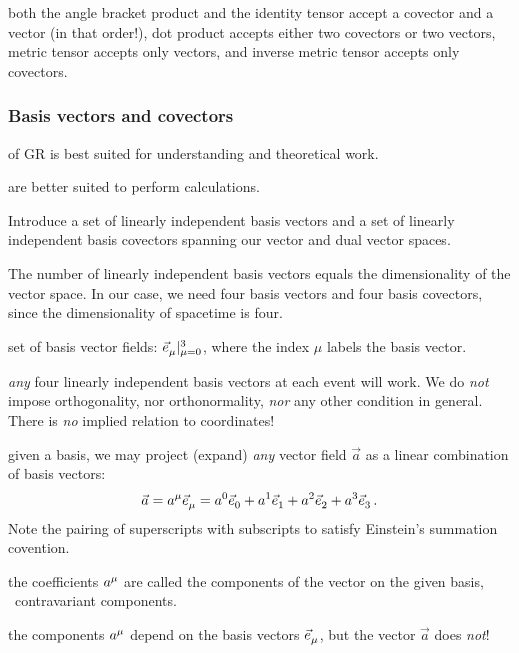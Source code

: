  both the angle bracket product and the identity tensor accept a covector and a vector (in that order!), dot product accepts either two covectors or two vectors, metric tensor accepts only vectors, and inverse metric tensor accepts only covectors.


\subsubsection{Basis vectors and covectors}
%
 of GR is best suited for understanding and theoretical work.

 are better suited to perform calculations.

 Introduce a set of linearly independent basis vectors and a set of linearly independent basis covectors spanning our vector and dual vector spaces.

 The number of linearly independent basis vectors equals the dimensionality of the vector space. In our case, we need four basis vectors and four basis covectors, since the dimensionality of spacetime is four.

 set of basis vector fields: $\bset{\tbvec\mu}{\mu = 0}{3}$, where the index $\mu$ labels the basis vector.

 \emph{any} four linearly independent basis vectors at each event will work. We do \emph{not} impose orthogonality, nor orthonormality, \emph{nor} any other condition in general. There is \emph{no} implied relation to coordinates!

 given a basis, we may project (expand) \emph{any} vector field $\vec a$ as a linear combination of basis vectors:
%
\begin{equation}\label{eq:vectorprojectiononbasisvectors}
  \vec a = \tvec a\mu\tbvec\mu
         = \tvec a0\tbvec 0 + \tvec a1\tbvec 1 + \tvec a2\tbvec 2 + \tvec a3\tbvec 3\,.
\end{equation}
%
Note the pairing of superscripts with subscripts to satisfy Einstein's summation covention.

 the coefficients $\tvec a\mu$ are called the components of the vector on the given basis, \aka\ contravariant components.

 the components $\tvec a\mu$ depend on the basis vectors $\tbvec\mu$, but the vector $\vec a$ does \emph{not}!

